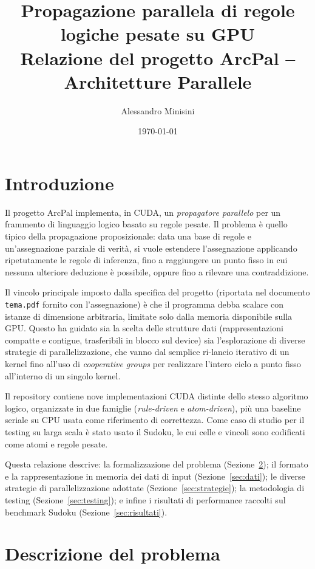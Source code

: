 \documentclass[11pt,a4paper]{article}
\title{Propagazione parallela di regole logiche pesate su GPU\\
\large Relazione del progetto ArcPal -- Architetture Parallele}
\author{Alessandro Minisini}
\date{\today}
\begin{document}
\maketitle
\tableofcontents

\newpage

\section{Introduzione}

Il progetto ArcPal implementa, in CUDA, un \emph{propagatore parallelo} per un frammento di
linguaggio logico basato su regole pesate. Il problema è quello tipico della propagazione
proposizionale: data una base di regole e un'assegnazione parziale di verità, si vuole estendere
l'assegnazione applicando ripetutamente le regole di inferenza, fino a raggiungere un punto fisso
in cui nessuna ulteriore deduzione è possibile, oppure fino a rilevare una contraddizione.

Il vincolo principale imposto dalla specifica del progetto (riportata nel documento
\texttt{tema.pdf} fornito con l'assegnazione) è che il programma debba scalare con istanze di
dimensione arbitraria, limitate solo dalla memoria disponibile sulla GPU. Questo ha guidato sia la
scelta delle strutture dati (rappresentazioni compatte e contigue, trasferibili in blocco sul
device) sia l'esplorazione di diverse strategie di parallelizzazione, che vanno dal semplice
ri-lancio iterativo di un kernel fino all'uso di \emph{cooperative groups} per realizzare l'intero
ciclo a punto fisso all'interno di un singolo kernel.

Il repository contiene nove implementazioni CUDA distinte dello stesso algoritmo logico,
organizzate in due famiglie (\emph{rule-driven} e \emph{atom-driven}), più una baseline seriale su
CPU usata come riferimento di correttezza. Come caso di studio per il testing su larga scala è
stato usato il Sudoku, le cui celle e vincoli sono codificati come atomi e regole pesate.

Questa relazione descrive: la formalizzazione del problema (Sezione~\ref{sec:problema}); il
formato e la rappresentazione in memoria dei dati di input (Sezione~\ref{sec:dati}); le diverse
strategie di parallelizzazione adottate (Sezione~\ref{sec:strategie}); la metodologia di testing
(Sezione~\ref{sec:testing}); e infine i risultati di performance raccolti sul benchmark Sudoku
(Sezione~\ref{sec:risultati}).

\section{Descrizione del problema}
\label{sec:problema}
\end{document}
